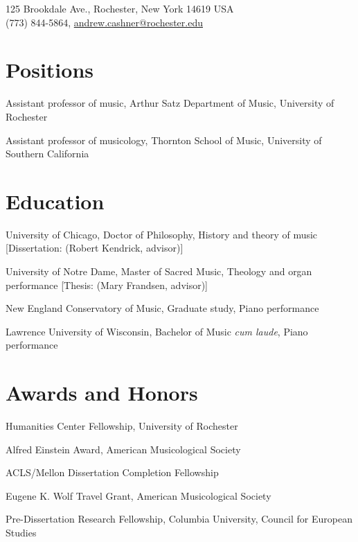 \documentclass{neh-resume}
\begin{document}

\begin{cvAddress}
125 Brookdale Ave., Rochester, New York 14619 USA \\
(773) 844-5864, \url{andrew.cashner@rochester.edu}
\end{cvAddress}

\section{Positions}
{Assistant professor of music,
Arthur Satz Department of Music, University of Rochester}

{Assistant professor of musicology,
Thornton School of Music, University of Southern California}

\section{Education}
{University of Chicago,
Doctor of Philosophy, History and theory of music}
[Dissertation:  (Robert Kendrick, advisor)]

{University of Notre Dame,
Master of Sacred Music, Theology and organ performance}
[Thesis:  (Mary Frandsen, advisor)]

{New England Conservatory of Music,
Graduate study, Piano performance}

{Lawrence University of Wisconsin,
Bachelor of Music \emph{cum laude}, Piano performance}

\section{Awards and Honors}
{Humanities Center Fellowship, University of Rochester}

{Alfred Einstein Award, American Musicological Society}

{ACLS/Mellon Dissertation Completion Fellowship}

{Eugene K. Wolf Travel Grant, American Musicological Society}

{Pre-Dissertation Research Fellowship, Columbia University, Council for
European Studies}
\end{document}
